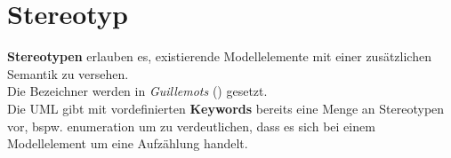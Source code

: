 \section{Stereotyp}

\begin{tcolorbox}[title=Konzept der Stereotypen]
    \textbf{Stereotypen} erlauben es, existierende Modellelemente mit einer zusätzlichen Semantik zu versehen. \\
    Die Bezeichner werden in \textit{Guillemots} (\guillemotleft \guillemotright) gesetzt.\\

    \noindent
    Die UML gibt mit vordefinierten \textbf{Keywords} bereits eine Menge an Stereotypen vor, bspw. \guillemotleft enumeration \guillemotright um zu verdeutlichen, dass es sich bei einem Modellelement um eine Aufzählung handelt.
\end{tcolorbox}